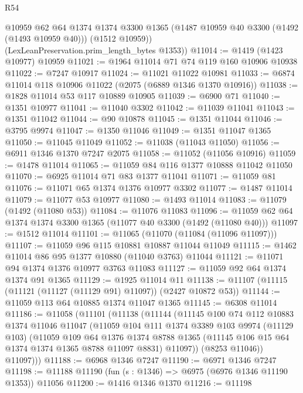 \begin{lexlean}{R54}
\begin{coremodule}
        @10959
        @62
        @64
        @1374
        @1374
        @3300
        @1365
        (@1487 @10959 @40 @3300 (@1492 (@1493 @10959 @40)))
        (@1512 @10959))
      (LexLeanPreservation.prim_length_bytes @1353))
@11014 := @1419 (@1423 @10977) @10959
@11021 := @1964 @11014 @71 @74 @119 @160 @10906 @10938
@11022 := @7247 @10917
@11024 := @11021 @11022 @10981
@11033 := @6874 @11014 @118 @10906 @11022 (@2075 (@6889 @1346 @1370 @10916))
@11038 := @1828 @11014 @53 @117 @10889 @10905
@11039 := @6900 @71
@11040 := @1351 @10977
@11041 := @11040 @3302
@11042 := @11039 @11041
@11043 := @1351 @11042
@11044 := @90 @10878
@11045 := @1351 @11044
@11046 := @3795 @9974
@11047 := @1350 @11046
@11049 := @1351 @11047 @1365
@11050 := @11045 @11049
@11052 := @11038 (@11043 @11050)
@11056 := @6911 @1346 @1370 @7247 @2075
@11058 := @11052 (@11056 @10916)
@11059 := @1478 @11014
@11065 := @11059 @84 @116 @1377 @10888 @11042 @11050
@11070 := @6925 @11014 @71 @83 @1377 @11041
@11071 := @11059 @81
@11076 := @11071 @65 @1374 @1376 @10977 @3302
@11077 := @1487 @11014
@11079 := @11077 @53 @10977
@11080 := @1493 @11014
@11083 := @11079 (@1492 (@11080 @53))
@11084 := @11076 @11083
@11096 := @11059 @62 @64 @1374 @1374 @3300 @1365 (@11077 @40 @3300 (@1492 (@11080 @40)))
@11097 := @1512 @11014
@11101 := @11065 (@11070 (@11084 (@11096 @11097)))
@11107 := @11059 @96 @115 @10881 @10887 @11044 @11049
@11115 := @1462 @11014 @86 @95 @1377 @10880 (@11040 @3763) @11044
@11121 := @11071 @94 @1374 @1376 @10977 @3763 @11083
@11127 := @11059 @92 @64 @1374 @1374 @91 @1365
@11129 := @1925 @11014 @11
@11138 := @11107 (@11115 (@11121 (@11127 (@11129 @91) @11097)) (@2427 @10872 @53))
@11144 := @11059 @113 @64 @10885 @1374 @11047 @1365
@11145 := @6308 @11014
@11186 := @11058
    (@11101
      (@11138
        (@11144
          (@11145
            @100
            @74
            @112
            @10883
            @1374
            @11046
            @11047
            (@11059
              @104
              @111
              @1374
              @3389
              @103
              @9974
              (@11129 @103)
              (@11059
                @109
                @64
                @1376
                @1374
                @8788
                @1365
                (@11145 @106 @15 @64 @1374 @1374 @1365 @8788 @11097 @8831)
                @11097))
            (@8253 @11046))
          @11097)))
@11188 := @6968 @1346 @7247
@11190 := @6971 @1346 @7247
@11198 := @11188 @11190 (fun (s : @1346) => @6975 (@6976 @1346 @11190 @1353)) @11056
@11200 := @1416 @1346 @1370
@11216 := @11198

\end{coremodule}
\end{lexlean}

